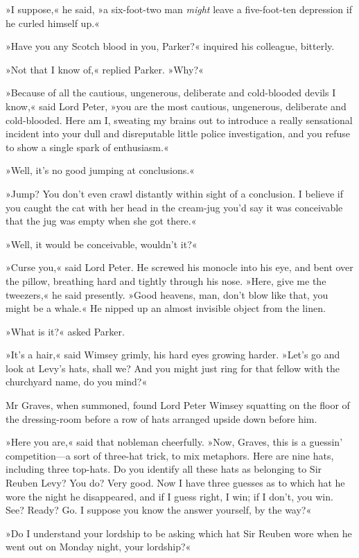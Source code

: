 »I suppose,« he said, »a six-foot-two man \textit{might} leave a five-foot-ten depression if he curled himself up.«

»Have you any Scotch blood in you, Parker?« inquired his colleague, bitterly.

»Not that I know of,« replied Parker. »Why?«

»Because of all the cautious, ungenerous, deliberate and cold-blooded devils I know,« said Lord Peter, »you are the most cautious, ungenerous, deliberate and cold-blooded. Here am I, sweating my brains out to introduce a really sensational incident into your dull and disreputable little police investigation, and you refuse to show a single spark of enthusiasm.«

»Well, it's no good jumping at conclusions.«

»Jump? You don't even crawl distantly within sight of a conclusion. I believe if you caught the cat with her head in the cream-jug you'd say it was conceivable that the jug was empty when she got there.«

»Well, it would be conceivable, wouldn't it?«

»Curse you,« said Lord Peter. He screwed his monocle into his eye, and bent over the pillow, breathing hard and tightly through his nose. »Here, give me the tweezers,« he said presently. »Good heavens, man, don't blow like that, you might be a whale.« He nipped up an almost invisible object from the linen.

»What is it?« asked Parker.

»It's a hair,« said Wimsey grimly, his hard eyes growing harder. »Let's go and look at Levy's hats, shall we? And you might just ring for that fellow with the churchyard name, do you mind?«

Mr Graves, when summoned, found Lord Peter Wimsey squatting on the floor of the dressing-room before a row of hats arranged upside down before him.

»Here you are,« said that nobleman cheerfully. »Now, Graves, this is a guessin' competition—a sort of three-hat trick, to mix metaphors. Here are nine hats, including three top-hats. Do you identify all these hats as belonging to Sir Reuben Levy? You do? Very good. Now I have three guesses as to which hat he wore the night he disappeared, and if I guess right, I win; if I don't, you win. See? Ready? Go. I suppose you know the answer yourself, by the way?«

»Do I understand your lordship to be asking which hat Sir Reuben wore when he went out on Monday night, your lordship?«

